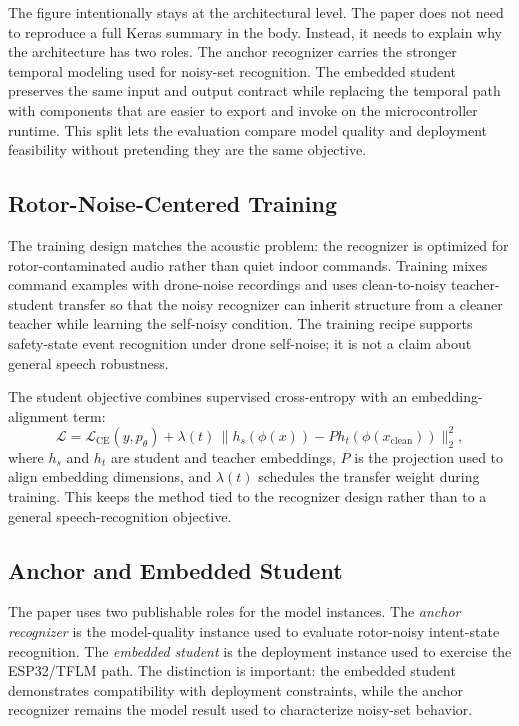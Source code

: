 The figure intentionally stays at the architectural level. The paper does not need to reproduce a full Keras summary in the body. Instead, it needs to explain why the architecture has two roles. The anchor recognizer carries the stronger temporal modeling used for noisy-set recognition. The embedded student preserves the same input and output contract while replacing the temporal path with components that are easier to export and invoke on the microcontroller runtime. This split lets the evaluation compare model quality and deployment feasibility without pretending they are the same objective.

\subsection{Rotor-Noise-Centered Training}

The training design matches the acoustic problem: the recognizer is optimized for rotor-contaminated audio rather than quiet indoor commands. Training mixes command examples with drone-noise recordings and uses clean-to-noisy teacher-student transfer so that the noisy recognizer can inherit structure from a cleaner teacher while learning the self-noisy condition. The training recipe supports safety-state event recognition under drone self-noise; it is not a claim about general speech robustness.

The student objective combines supervised cross-entropy with an embedding-alignment term:
\[
\mathcal{L}
=
\mathcal{L}_{\mathrm{CE}}(y, p_{\theta})
 + \lambda(t)\,
\lVert h_s(\phi(x)) - P h_t(\phi(x_{\mathrm{clean}})) \rVert_2^2,
\]
where $h_s$ and $h_t$ are student and teacher embeddings, $P$ is the projection used to align embedding dimensions, and $\lambda(t)$ schedules the transfer weight during training. This keeps the method tied to the recognizer design rather than to a general speech-recognition objective.

\subsection{Anchor and Embedded Student}

The paper uses two publishable roles for the model instances. The \emph{anchor recognizer} is the model-quality instance used to evaluate rotor-noisy intent-state recognition. The \emph{embedded student} is the deployment instance used to exercise the ESP32/TFLM path. The distinction is important: the embedded student demonstrates compatibility with deployment constraints, while the anchor recognizer remains the model result used to characterize noisy-set behavior.


